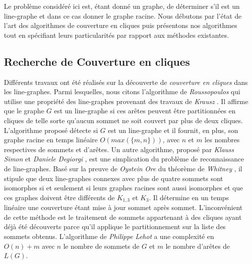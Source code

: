 

Le probl\`eme consid\'er\'e ici est, 
\'etant donn\'e un graphe, de d\'eterminer s'il est un line-graphe et dans ce cas donner le graphe racine.
Nous d\'ebutons par l'\'etat de l'art des algorithmes de couverture en cliques puis pr\'esentons nos algorithmes tout en sp\'ecifiant leurs particularit\'es par rapport aux m\'ethodes existantes. 

\subsection{Recherche de Couverture en cliques}
Diff\'erents travaux ont \'et\'e r\'ealis\'es sur la d\'ecouverte de {\em couverture en cliques} dans les line-graphes.
Parmi lesquelles, nous citons  l'algorithme de {\em Roussopoulos}  \cite{ROUSSOPOULOS1973108} qui utilise une propri\'et\'e des line-graphes provenant des travaux de {\em Krausz} \cite{krausz1943demonstration}. 
Il affirme que le graphe $G$ est un line-graphe si ces ar\^etes  peuvent \^etre partitionn\'ees en cliques  de telle sorte qu'aucun sommet ne soit couvert par plus de deux cliques. 
L'algorithme propos\'e d\'etecte si $G$ est un line-graphe et il fournit, en plus, son graphe racine en temps lin\'eaire $O(max(\{m,n\}))$, avec $n$ et $m$ les nombres respectives de sommets et d'ar\^etes.
\newline
Un autre algorithme, propos\'e par {\em Klauss Simon} et {\em Daniele Degiorgi} \cite{decompositionEnCliques}, est une simplication du probl\`eme de reconnaissance de line-graphes. Bas\'e sur la preuve de {\em Oystein Ore} \cite{ORE} du th\'eor\`eme de {\em Whitney} \cite{whitney1932congruent}, il stipule que deux line-graphes connexes avec plus de quatre sommets sont isomorphes si et seulement si leurs graphes racines sont aussi isomorphes et que ces graphes  doivent \^etre diff\'erents de $K_{1,3}$ et $K_3$. Il d\'etermine en un temps lin\'eaire une couverture \'etant mise \`a jour sommet apr\`es sommet. 
L'inconv\'enient de cette m\'ethode est le traitement de sommets appartenant \`a des cliques ayant d\'ej\`a \'et\'e d\'ecouverts parce qu'il applique le partitionnement sur la liste des sommets obtenus.
\newline
L'algorithme de {\em Philippe Lehot} \cite{decompositionEnCliquesParArcs} a une complexit\'e en $O(n) + m$ avec $n$ le nombre de sommets de $G$ et $m$ le nombre d'ar\^etes de $L(G)$.

